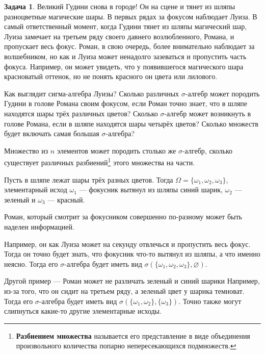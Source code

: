 \documentclass[pdftex, 12pt, a4paper]{article}
\def\s{\ensuremath{\sigma}}
\def \Om{\Omega}
\def \om{\omega}
\theoremstyle{definition} %
\newtheorem{problem}{Задача}
\numberwithin{problem}{section}
\newcommand{\indef}[1]{\textbf{#1}}
\numberwithin{blits}{section}
\begin{document}
\begin{problem}
Великий Гудини снова в городе! Он на сцене и тянет из шляпы разноцветные магические шары. В первых рядах за фокусом наблюдает Луиза. В самый ответственный момент, когда Гудини тянет из шляпы магический шар, Луиза замечает на третьем ряду своего давнего возлюбленного, Романа, и пропускает весь фокус. Роман, в свою очередь, более внимательно наблюдает за волшебником, но как и Луиза может ненадолго зазеваться и пропустить часть фокуса. Например, он может увидеть, что у появившегося магического шара красноватый оттенок, но не понять красного он цвета или лилового.

Как выглядит сигма-алгебра Луизы? Сколько различных \s-алгебр может породить Гудини в голове Романа своим фокусом, если Роман точно знает, что в шляпе находятся шары трёх различных цветов? Сколько \s-алгебр может возникнуть в голове Романа, если в шляпе находятся шары четырёх цветов? 
Сколько множеств будет включать самая большая \s-алгебра?
\begin{sol}

Множество из $n$ элементов может породить столько же \s-алгебр, сколько существует различных разбиений\footnote{\indef{Разбиением множества} называется его представление в виде объединения произвольного количества попарно непересекающихся подмножеств.} этого множества на части. 

Пусть в шляпе лежат шары трёх разных цветов. Тогда  $\Om = \{\om_1,\om_2,\om_3\}$, элементарный исход  $\om_1$ --- фокусник  вытянул  из шляпы синий шарик, $\om_2$ --- зеленый и $\om_3$ --- красный. 

Роман, который смотрит за фокусником совершенно по-разному может быть наделен информацией. 

Например, он как Луиза может на секунду отвлечься и пропустить весь фокус. Тогда он точно будет знать, что фокусник что-то вытянул из шляпы, а что именно неясно. Тогда его \s-алгебра будет иметь вид $\s(\{\om_1,\om_2,\om_3\},\varnothing )$.
 
Другой пример --- Роман может не различать зеленый и синий шарики Например, из-за того, что он сидит на третьем ряду, а зеленый цвет у шарика темноват. Тогда его \s-алгебра будет иметь вид $\s( \{\om_1,\om_2\},\{\om_3\})$. Точно также могут слипнуться какие-то другие элементарные исходы.
 

\end{sol}
\end{problem}
\end{document}
